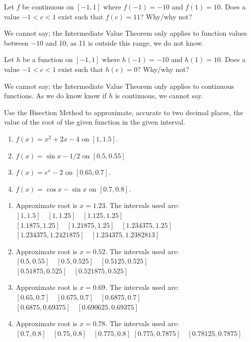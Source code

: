 \begin{enumialphparenastyle}
\begin{ex}
\end{ex}
\begin{ex}
 {Let $f$ be continuous on $[-1,1]$ where $f(-1) = -10$ and $f(1) = 10$. Does a value $-1<c<1$ exist such that $f(c) = 11$? Why/why not?
 }
 
 

\begin{sol}
 {We cannot say; the Intermediate Value Theorem only applies to function values between $-10$ and 10; as 11 is outside this range, we do not know.
  }
\end{sol}

\end{ex}
\begin{ex}
 {Let $h$ be a function on $[-1,1]$ where $h(-1) = -10$ and $h(1) = 10$. Does a value $-1<c<1$ exist such that $h(c) = 0$? Why/why not?
 }
 

\begin{sol}
 {We cannot say; the Intermediate Value Theorem only applies to continuous functions. As we do know know if $h$ is continuous, we cannot say.
  }
\end{sol}

\end{ex}

\begin{ex}
Use the Bisection Method to approximate, accurate to two decimal places, the value of the root of the given function in the given interval.
\begin{enumerate}
\item {$f(x) = x^2+2x-4$ on $[1,1.5]$.
}

\item {$f(x) = \sin x - 1/2$ on $[0.5,0.55]$
}

\item {$f(x) = e^x - 2$ on $[0.65,0.7]$.
}

\item {$f(x) = \cos x -\sin x$ on $[0.7,0.8]$.
}

\end{enumerate}

\begin{sol}
\begin{enumerate}
\item {Approximate root is $x=1.23$. The intervals used are:
$[1,1.5] \quad [1,1.25] \quad [1.125,1.25]$
$[1.1875,1.25]\quad [1.21875,1.25]\quad [1.234375,1.25]$
$[1.234375,1.2421875]\quad [1.234375,1.2382813]$
}
\item {Approximate root is $x=0.52$. The intervals used are:
$[0.5,0.55] \quad [0.5,0.525] \quad [0.5125,0.525]$
$[0.51875,0.525]\quad [0.521875,0.525]$
}
\item {Approximate root is $x=0.69$. The intervals used are:
$[0.65,0.7] \quad [0.675,0.7] \quad [0.6875,0.7]$
$[0.6875,0.69375]\quad [0.690625,0.69375]$
}
\item {Approximate root is $x=0.78$. The intervals used are:
$[0.7,0.8] \quad [0.75,0.8] \quad [0.775,0.8]$
$[0.775,0.7875]\quad [0.78125,0.7875]$

}
\end{enumerate}
\end{sol}
\end{ex}
\end{enumialphparenastyle}
